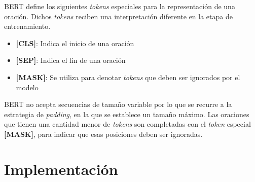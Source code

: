 BERT define los siguientes \textit{tokens} especiales para la representación de una oración. Dichos \textit{tokens} reciben una interpretación diferente en la etapa de entrenamiento.
\begin{itemize}
  \item \textbf{[CLS]}: Indica el inicio de una oración
  \item \textbf{[SEP]}: Indica el fin de una oración
  \item \textbf{[MASK]}: Se utiliza para denotar \textit{tokens} que deben ser ignorados por el modelo
\end{itemize}

BERT no acepta secuencias de tamaño variable por lo que se recurre a la estrategia de \textit{padding}, en la que se establece un tamaño máximo. Las oraciones que tienen una cantidad menor de \textit{tokens} son completadas con el \textit{token} especial \textbf{[MASK]}, para indicar que esas posiciones deben ser ignoradas.

\section{Implementación}




